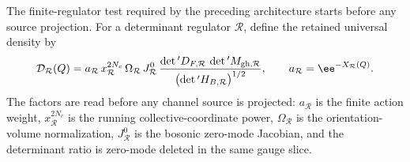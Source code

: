 \begin{controlledapproximation}
\label{ca:instanton-finite-determinant-conversion-benchmark}
The finite-regulator test required by the preceding architecture starts before
any source projection.  For a determinant regulator \(\mathcal R\), define the
retained universal density by
\begin{equation}
  \mathcal D_{\mathcal R}(Q)
  =
  a_{\mathcal R}\,
  x_{\mathcal R}^{2N_c}\,
  \Omega_{\mathcal R}\,
  J_{\mathcal R}^{0}\,
  \frac{
    \det{}'D_{F,\mathcal R}\,
    \det{}'M_{{\rm gh},\mathcal R}
  }{
    \bigl(\det{}'H_{B,\mathcal R}\bigr)^{1/2}
  },
  \qquad
  a_{\mathcal R}=\ee^{-X_{\mathcal R}(Q)} .
  \label{eq:instanton-finite-determinant-benchmark-density}
\end{equation}
The factors are read before any channel source is projected: \(a_{\mathcal R}\)
is the finite action weight, \(x_{\mathcal R}^{2N_c}\) is the running
collective-coordinate power, \(\Omega_{\mathcal R}\) is the orientation-volume
normalization, \(J_{\mathcal R}^{0}\) is the bosonic zero-mode Jacobian, and
the determinant ratio is zero-mode deleted in the same gauge slice.


\end{controlledapproximation}
